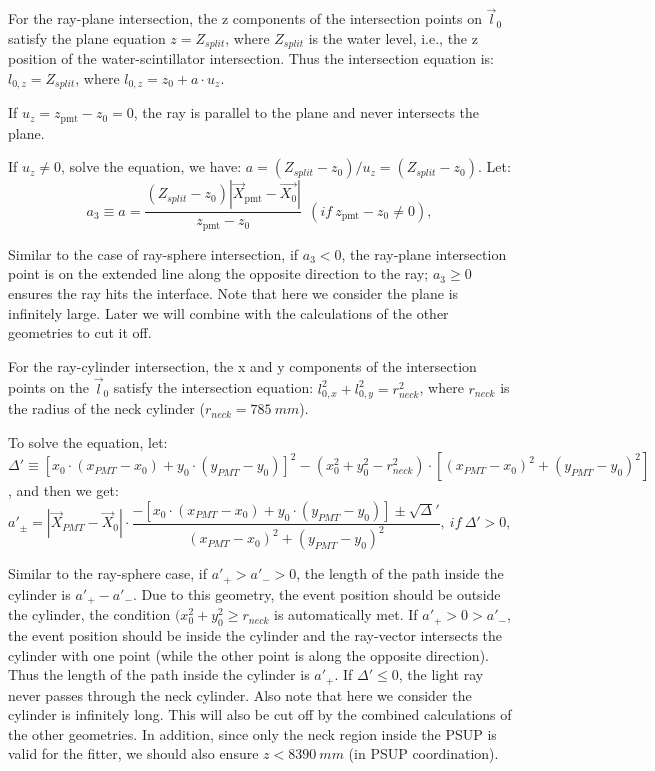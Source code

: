 For the ray-plane intersection, the z components of the intersection points on $\vec{l}_0$ satisfy the plane equation $z=Z_{split}$, where $Z_{split}$ is the water level, i.e., the z position of the water-scintillator intersection. Thus the intersection equation is:
$l_{0,z}=Z_{split}$, where $l_{0,z}=z_0+a\cdot u_z$.

If $u_z=z_\mathrm{pmt}-z_0=0$, the ray is parallel to the plane and never intersects the plane.

If $u_z\neq 0$, solve the equation, we have: $a=(Z_{split}-z_0)/u_z=(Z_{split}-z_0)$.
Let: 
\begin{equation}
a_3 \equiv a = \frac{(Z_{split}-z_0)|\vec{X}_{\mathrm{pmt}}-\vec{X_0}|}{z_\mathrm{pmt}-z_0}~~(if ~z_\mathrm{pmt}-z_0\neq 0),
\end{equation}

Similar to the case of ray-sphere intersection, if $a_3<0$, the ray-plane intersection point is on the extended line along the opposite direction to the ray; $a_3 \geq 0$ ensures the ray hits the interface. Note that here we consider the plane is infinitely large. Later we will combine with the calculations of the other geometries to cut it off. 

For the ray-cylinder intersection, the x and y components of the intersection points on the $\vec l_0$ satisfy the intersection equation: $l^2_{0,x}+l^2_{0,y} = r^2_{neck}$, where $r_{neck}$ is the radius of the neck cylinder ($r_{neck}=785~mm$).

To solve the equation,  let: $\Delta'\equiv [x_0\cdot (x_{PMT}-x_0)+y_0\cdot(y_{PMT}-y_0)]^2 - ( x_0^2+y_0^2-r^2_{neck})\cdot [(x_{PMT}-x_0)^2+(y_{PMT}-y_0)^2]$, and then we get: 
\begin{equation}\label{eq:ray-cylinder}
a'_{\pm} = |\vec{X}_{PMT}-\vec{X}_0|\cdot\frac{-[x_0\cdot (x_{PMT}-x_0)+y_0\cdot(y_{PMT}-y_0)] \pm \sqrt\Delta' }{(x_{PMT}-x_0)^2+(y_{PMT}-y_0)^2},~if~\Delta'>0,
\end{equation}

Similar to the ray-sphere case, if $a'_{+}>a'_->0$, the length of the path inside the cylinder is $a'_+-a'_-$. Due to this geometry, the event position should be outside the cylinder, the condition $(x^2_0+y^2_0\geq r_{neck}$ is automatically met. If $a'_+>0>a'_-$, the event position should be inside the cylinder and the ray-vector intersects the cylinder with one point (while the other point is along the opposite direction). Thus the length of the path inside the cylinder is $a'_+$. If $\Delta'\leq0$, the light ray never passes through the neck cylinder. Also note that here we consider the cylinder is infinitely long. This will also be cut off by the combined calculations of the other geometries. In addition, since only the neck region inside the PSUP is valid for the fitter, we should also ensure $z<8390~mm$ (in PSUP coordination).

